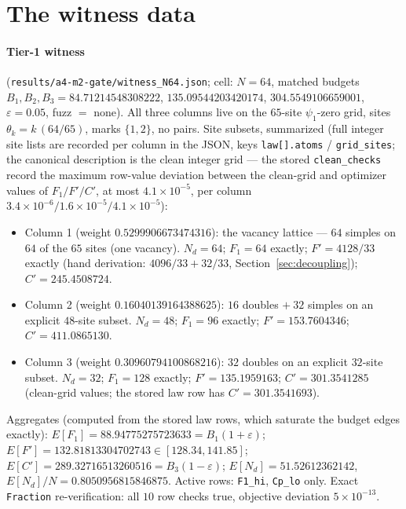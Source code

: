 \documentclass[11pt]{article}
\theoremstyle{plain}
\theoremstyle{definition}
\theoremstyle{remark}
\newcommand{\Nd}{N_{d}}
\begin{document}
\appendix

\section{The witness data}
\label{app:witness}

\paragraph{Tier-1 witness}
(\texttt{results/a4-m2-gate/}\allowbreak\texttt{witness\_N64.json}; cell: $N = 64$, matched budgets
$B_1, B_2, B_3 = 84.71214548308222$, $135.09544203420174$,
$304.5549106659001$, $\varepsilon = 0.05$, fuzz $=$ none). All three columns live
on the $65$-site $\psi_1$-zero grid, sites $\theta_k = k\,(64/65)$, marks
$\{1, 2\}$, no pairs. Site subsets, summarized (full integer site lists are
recorded per column in the JSON, keys \texttt{law[].atoms} /
\texttt{grid\_sites}; the canonical description is the clean integer grid --- the
stored \texttt{clean\_checks} record the maximum row-value deviation between the
clean-grid and optimizer values of $F_1/F'/C'$, at most $4.1 \times 10^{-5}$, per
column $3.4 \times 10^{-6} / 1.6 \times 10^{-5} / 4.1 \times 10^{-5}$):

\begin{itemize}
\item Column 1 (weight $0.5299906673474316$): the vacancy lattice --- $64$
  simples on $64$ of the $65$ sites (one vacancy). $\Nd = 64$; $F_1 = 64$
  exactly; $F' = 4128/33$ exactly (hand derivation: $4096/33 + 32/33$,
  Section~\ref{sec:decoupling}); $C' = 245.4508724$.
\item Column 2 (weight $0.16040139164388625$): $16$ doubles $+\ 32$ simples on
  an explicit $48$-site subset. $\Nd = 48$; $F_1 = 96$ exactly;
  $F' = 153.7604346$; $C' = 411.0865130$.
\item Column 3 (weight $0.30960794100868216$): $32$ doubles on an explicit
  $32$-site subset. $\Nd = 32$; $F_1 = 128$ exactly; $F' = 135.1959163$;
  $C' = 301.3541285$ (clean-grid values; the stored law row has
  $C' = 301.3541693$).
\end{itemize}

Aggregates (computed from the stored law rows, which saturate the budget edges
exactly): $E[F_1] = 88.94775275723633 = B_1(1 + \varepsilon)$;
$E[F'] = 132.81813304702743 \in [128.34, 141.85]$;
$E[C'] = 289.32716513260516 = B_3(1 - \varepsilon)$; $E[\Nd] = 51.52612362142$,
$E[\Nd]/N = 0.8050956815846875$. Active rows: \texttt{F1\_hi},
\texttt{Cp\_lo} only. Exact \texttt{Fraction} re-verification: all $10$ row checks
true, objective deviation $5 \times 10^{-13}$.
\end{document}
